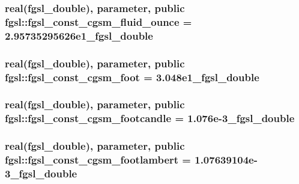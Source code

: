\subsubsection[{fgsl\+\_\+const\+\_\+cgsm\+\_\+fluid\+\_\+ounce}]{\setlength{\rightskip}{0pt plus 5cm}real({\bf fgsl\+\_\+double}), parameter, public fgsl\+::fgsl\+\_\+const\+\_\+cgsm\+\_\+fluid\+\_\+ounce = 2.\+95735295626e1\+\_\+fgsl\+\_\+double}\label{namespacefgsl_ada803a980994f045ecc9fa32cebad23b}
\hypertarget{namespacefgsl_a479fa8c0e8ae3d17e949a4a365a39c19}{}
\subsubsection[{fgsl\+\_\+const\+\_\+cgsm\+\_\+foot}]{\setlength{\rightskip}{0pt plus 5cm}real({\bf fgsl\+\_\+double}), parameter, public fgsl\+::fgsl\+\_\+const\+\_\+cgsm\+\_\+foot = 3.\+048e1\+\_\+fgsl\+\_\+double}\label{namespacefgsl_a479fa8c0e8ae3d17e949a4a365a39c19}
\hypertarget{namespacefgsl_ab94d2a4bddeb2056b97285714a740131}{}
\subsubsection[{fgsl\+\_\+const\+\_\+cgsm\+\_\+footcandle}]{\setlength{\rightskip}{0pt plus 5cm}real({\bf fgsl\+\_\+double}), parameter, public fgsl\+::fgsl\+\_\+const\+\_\+cgsm\+\_\+footcandle = 1.\+076e-\/3\+\_\+fgsl\+\_\+double}\label{namespacefgsl_ab94d2a4bddeb2056b97285714a740131}
\hypertarget{namespacefgsl_a392158d18a3d487acc9ed9d88636066c}{}
\subsubsection[{fgsl\+\_\+const\+\_\+cgsm\+\_\+footlambert}]{\setlength{\rightskip}{0pt plus 5cm}real({\bf fgsl\+\_\+double}), parameter, public fgsl\+::fgsl\+\_\+const\+\_\+cgsm\+\_\+footlambert = 1.\+07639104e-\/3\+\_\+fgsl\+\_\+double}\label{namespacefgsl_a392158d18a3d487acc9ed9d88636066c}
\hypertarget{namespacefgsl_af917fb04d607724208d74a65a71644fe}{}
